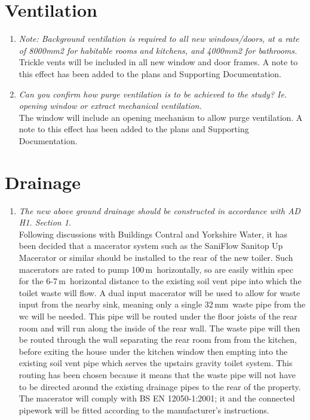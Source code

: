 \documentclass{extension}
\newcommand{\mm}{\,$\mathrm{mm}$}
\newcommand{\m}{\,$\mathrm{m}$}
\begin{document}
\section{Ventilation}
\begin{enumerate}
\item {\it Note: Background ventilation is required to all new windows/doors, at a rate of 8000mm2 for habitable rooms and kitchens, and 4000mm2 for bathrooms.}\\
Trickle vents will be included in all new window and door frames. A note to this effect has been added to the plans and Supporting Documentation.
\item {\it Can you confirm how purge ventilation is to be achieved to the study? Ie. opening window or extract mechanical ventilation.}\\
The window will include an opening mechanism to allow purge ventilation. A note to this effect has been added to the plans and Supporting Documentation.
\end{enumerate}

\section{Drainage}
\begin{enumerate}
\item {\it The new above ground drainage should be constructed in accordance with AD H1. Section 1.}\\
Following discussions with Buildings Contral and Yorkshire Water, it has been decided that a macerator system such as the SaniFlow Sanitop Up Macerator\cite{macerator} or similar should be installed to the rear of the new toiler. Such macerators are rated to pump 100\m\ horizontally, so are easily within spec for the 6-7\m\ horizontal distance to the existing soil vent pipe into which the toilet waste will flow. A dual input macerator will be used to allow for waste input from the nearby sink, meaning only a single 32\mm\ waste pipe from the wc will be needed. This pipe will be routed under the floor joists of the rear room and will run along the inside of the rear wall. The waste pipe will then be routed through the wall separating the rear room from from the kitchen, before exiting the house under the kitchen window then empting into the existing soil vent pipe which serves the upstairs gravity toilet system. This routing has been chosen because it means that the waste pipe will not have to be directed around the existing drainage pipes to the rear of the property. The macerator will comply with BS EN 12050-1:2001; it and the connected pipework will be fitted according to the manufacturer's instructions.
\end{enumerate}
\end{document}
